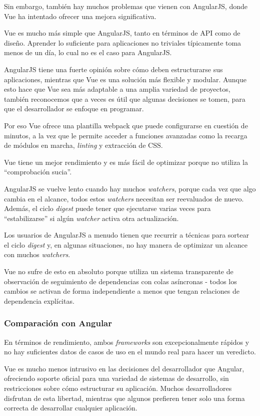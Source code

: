 Sin embargo, también hay muchos problemas que vienen con AngularJS, donde Vue ha intentado ofrecer una mejora significativa.


Vue es mucho más simple que AngularJS, tanto en términos de API como de diseño. Aprender lo suficiente para aplicaciones no triviales típicamente toma menos de un día, lo cual no es el caso para AngularJS.


AngularJS tiene una fuerte opinión sobre cómo deben estructurarse sus aplicaciones, mientras que Vue es una solución más flexible y modular. Aunque esto hace que Vue sea más adaptable a una amplia variedad de proyectos, también reconocemos que a veces es útil que algunas decisiones se tomen, para que el desarrollador se enfoque en programar.


Por eso Vue ofrece una plantilla webpack que puede configurarse en cuestión de minutos, a la vez que le permite acceder a funciones avanzadas como la recarga de módulos en marcha, \textit{linting} y extracción de CSS.


Vue tiene un mejor rendimiento y es más fácil de optimizar porque no utiliza la ``comprobación sucia”. 


AngularJS se vuelve lento cuando hay muchos \textit{watchers}, porque cada vez que algo cambia en el alcance, todos estos \textit{watchers} necesitan ser reevaluados de nuevo. Además, el ciclo \textit{digest} puede tener que ejecutarse varias veces para ``estabilizarse” si algún \textit{watcher} activa otra actualización.


Los usuarios de AngularJS a menudo tienen que recurrir a técnicas para sortear el ciclo \textit{digest} y, en algunas situaciones, no hay manera de optimizar un alcance con muchos \textit{watchers}.



Vue no sufre de esto en absoluto porque utiliza un sistema transparente de observación de seguimiento de dependencias con colas asíncronas - todos los cambios se activan de forma independiente a menos que tengan relaciones de dependencia explícitas.


\subsubsection*{Comparación con Angular}
En términos de rendimiento, ambos \textit{frameworks} son excepcionalmente rápidos y no hay suficientes datos de casos de uso en el mundo real para hacer un veredicto.


Vue es mucho menos intrusivo en las decisiones del desarrollador que Angular, ofreciendo soporte oficial para una variedad de sistemas de desarrollo, sin restricciones sobre cómo estructurar su aplicación. Muchos desarrolladores disfrutan de esta libertad, mientras que algunos prefieren tener solo una forma correcta de desarrollar cualquier aplicación.


